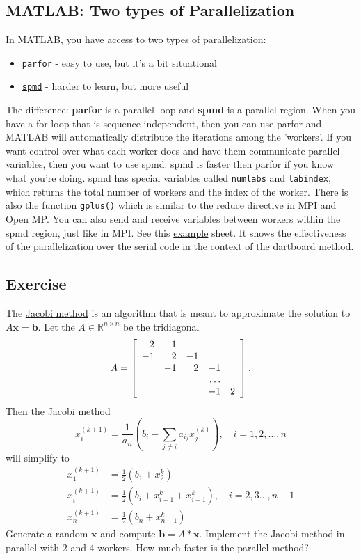 \documentclass{article}
\begin{document}
\subsection{MATLAB: Two types of Parallelization}
In MATLAB, you have access to two types of parallelization:
\begin{itemize}
    \item \texttt{\href{https://www.mathworks.com/help/distcomp/parfor.html}{parfor}} - easy to use, but it's a bit situational
    \item \texttt{\href{https://www.mathworks.com/help/distcomp/spmd.html}{spmd}} - harder to learn, but more useful
\end{itemize}
The difference: \textbf{parfor} is a parallel loop and \textbf{spmd} is a parallel region. When you have a for loop that is sequence-independent, then you can use parfor and MATLAB will automatically distribute the iterations among the 'workers'. If you want control over what each worker does and have them communicate parallel variables, then you want to use spmd. spmd is faster then parfor if you know what you're doing. spmd has special variables called \texttt{numlabs} and \texttt{labindex}, which returns the total number of workers and the index of the worker. There is also the function \texttt{gplus()} which is similar to the reduce directive in MPI and Open MP. You can also send and receive variables between workers within the spmd region, just like in MPI. See this \href{https://web.njit.edu/~tt73/Files/599/parallel_examples.mlx}{example} sheet. It shows the effectiveness of the parallelization over the serial code in the context of the dartboard method.

\subsection{Exercise}
The \href{https://en.wikipedia.org/wiki/Jacobi_method}{Jacobi method} is an algorithm that is meant to approximate the solution to $A\textbf{x}=\textbf{b}$. Let the $A\in \mathbb{R}^{n\times n}$ be the tridiagonal
$$A =  \left[ \begin{array} { r r r r r } {2}&{-1}&{} \\ {-1}&{2}&{-1}&{} \\ {}&{-1}&{2}&{-1} \\ {}&{}&{}&{\dots} \\ {}&{}&{}&{-1}&{2} \end{array} \right].$$
Then the Jacobi method
$$x _ { i } ^ { ( k + 1 ) } = \frac { 1 } { a _ { i i } } \left( b _ { i } - \sum _ { j \neq i } a _ { i j } x _ { j } ^ { ( k ) } \right) , \quad i = 1,2 , \ldots , n$$
will simplify to
\begin{align*}
    x_{1}^{(k+1)} &= \frac {1} {2} \left( b_{ 1 } + x_{2}^k \right) \\
    x_{i}^{(k+1)} &= \frac {1} {2} \left( b_{ i } + x_{i-1}^k + x_{i+1}^k \right) , \quad i = 2,3 \ldots , n-1 \\
    x_{n}^{(k+1)} &= \frac {1} {2} \left( b_{ n } + x_{n-1}^k \right)
\end{align*}
Generate a random $\textbf{x}$ and compute $\textbf{b}=A*\textbf{x}$. Implement the Jacobi method in parallel with 2 and 4 workers. How much faster is the parallel method?
\end{document}
